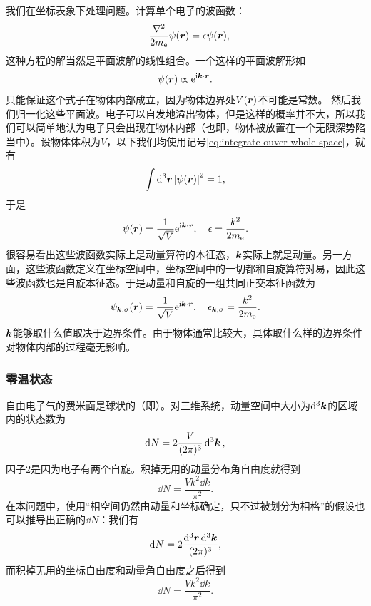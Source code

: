 我们在坐标表象下处理问题。计算单个电子的波函数：
\[
    - \frac{\laplacian}{2m_\text{e}} \psi(\vb*{r}) = \epsilon \psi(\vb*{r}),
\]
这种方程的解当然是平面波解的线性组合。一个这样的平面波解形如
\[
    \psi(\vb*{r}) \propto \mathrm{e}^{\mathrm{i} \vb*{k} \cdot \vb*{r}}.
\]
只能保证这个式子在物体内部成立，因为物体边界处$V(\vb*{r})$不可能是常数。
然后我们归一化这些平面波。电子可以自发地溢出物体，但是这样的概率并不大，所以我们可以简单地认为电子只会出现在物体内部（也即，物体被放置在一个无限深势陷当中）。设物体体积为$V$，以下我们均使用记号\eqref{eq:integrate-ouver-whole-space}，就有
\[
    \int \dd[3]{\vb*{r}} \abs{\psi(\vb*{r})}^2 = 1,
\]
于是
\[
    \psi (\vb*{r}) = \frac{1}{\sqrt{V}} \mathrm{e}^{\mathrm{i} \vb*{k} \cdot \vb*{r}}, \quad \epsilon = \frac{k^2}{2m_\text{e}}.
\]
很容易看出这些波函数实际上是动量算符的本征态，$\vb*{k}$实际上就是动量。另一方面，这些波函数定义在坐标空间中，坐标空间中的一切都和自旋算符对易，因此这些波函数也是自旋本征态。于是动量和自旋的一组共同正交本征函数为
\begin{equation}
    \psi_{\vb*{k},\sigma} (\vb*{r}) = \frac{1}{\sqrt{V}} \mathrm{e}^{\mathrm{i} \vb*{k} \cdot \vb*{r}}, \quad \epsilon_{\vb*{k},\sigma} = \frac{k^2}{2m_\text{e}}.
\end{equation}
$\vb*{k}$能够取什么值取决于边界条件。由于物体通常比较大，具体取什么样的边界条件对物体内部的过程毫无影响。

\subsubsection{零温状态} 

自由电子气的费米面是球状的（即）。对三维系统，动量空间中大小为$\dd[3]{\vb*{k}}$的区域内的状态数为
\begin{equation}
    \dd{N} = 2 \frac{V}{(2\pi)^3} \dd[3]{\vb*{k}},
\end{equation}
因子$2$是因为电子有两个自旋。积掉无用的动量分布角自由度就得到
\begin{equation}
    \dd{N} = \frac{V k^2 \dd{k}}{\pi^2}.
\end{equation}
在本问题中，使用“相空间仍然由动量和坐标确定，只不过被划分为相格”的假设也可以推导出正确的$\dd{N}$：我们有
\[
    \dd{N} = 2 \frac{\dd[3]{\vb*{r}} \dd[3]{\vb*{k}}}{(2\pi)^3},
\]
而积掉无用的坐标自由度和动量角自由度之后得到
\[
    \dd{N} = \frac{V k^2 \dd{k}}{\pi^2}.
\]

